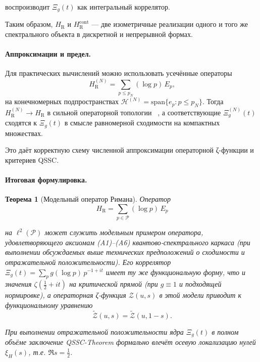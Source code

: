 \documentclass{article}
\numberwithin{equation}{section}
\theoremstyle{plain}
\newtheorem{theorem}{Теорема}
\theoremstyle{definition}
\theoremstyle{remark}
\begin{document}
воспроизводит $\Xi_g(t)$ как интегральный коррелятор.

Таким образом, $H_{\mathrm{R}}$ и $H_{\mathrm{R}}^{\mathrm{cont}}$
— две изометричные реализации одного и того же спектрального объекта
в дискретной и непрерывной формах.

\paragraph{Аппроксимации и предел.}

Для практических вычислений можно использовать усечённые операторы
\begin{equation}
H_{\mathrm{R}}^{(N)} = \sum_{p\le p_N} (\log p)\,E_p,
\end{equation}
на конечномерных подпространствах
$\mathcal H^{(N)}=\mathrm{span}\{e_p:p\le p_N\}$.
Тогда $H_{\mathrm{R}}^{(N)}\to H_{\mathrm{R}}$ в сильной операторной топологии ~\cite{Kato1995},
а соответствующие $\Xi^{(N)}_g(t)$ сходятся к $\Xi_g(t)$
в смысле равномерной сходимости на компактных множествах.

Это даёт корректную схему численной аппроксимации
операторной ζ-функции и критериев QSSC.

\paragraph{Итоговая формулировка.}

\begin{theorem}[Модельный оператор Римана]
Оператор
\begin{equation}
H_{\mathrm{R}}=\sum_{p\in\mathcal P}(\log p)\,E_p
\label{eq:QSSC0043}
\end{equation}

на $\ell^2(\mathcal P)$
может служить модельным примером оператора, удовлетворяющего аксиомам (A1)–(A6)
квантово-спектрального каркаса (при выполнении обсуждаемых выше
технических предположений о сходимости и отражательной положительности).
Его коррелятор $\Xi_g(t)=\sum_p g(\log p)\,p^{-1+it}$ имеет ту же функциональную
форму, что и значения $\zeta(\tfrac12+it)$ на критической прямой
(при $g\equiv1$ и подходящей нормировке),
а операторная ζ-функция $\mathcal Z(u,s)$ в этой модели приводит к
функциональному уравнению
\begin{equation}
\widetilde{\mathcal Z}(u,s)=\widetilde{\mathcal Z}(u,1-s).
\label{eq:QSSC0044}
\end{equation}

При выполнении отражательной положительности ядра $\Xi_g(t)$ в полном
объёме заключение QSSC-Theorem формально влечёт осевую локализацию нулей
$\xi_H(s)$, т.е. $\Re s=\tfrac12$.
\end{theorem}
\end{document}
